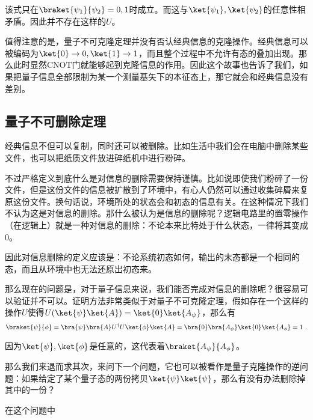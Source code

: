 该式只在$\braket{\psi_1}{\psi_2}=0,1$时成立。而这与$\ket{\psi_1},\ket{\psi_2}$的任意性相矛盾。因此并不存在这样的$U$。

值得注意的是，量子不可克隆定理并没有否认经典信息的克隆操作。经典信息可以被编码为$\ket{0}\to0,\ket{1}\to1$，而且整个过程中不允许有态的叠加出现。那么此时显然CNOT门就能够起到克隆信息的作用。因此这个故事也告诉了我们，如果把量子信息全部限制为某一个测量基矢下的本征态上，那它就会和经典信息没有差别。

\subsection{量子不可删除定理}

经典信息不但可以复制，同时还可以被删除。比如生活中我们会在电脑中删除某些文件，也可以把纸质文件放进碎纸机中进行粉碎。

不过严格定义到底什么是对信息的删除需要保持谨慎。比如说即使我们粉碎了一份文件，但是这份文件的信息被扩散到了环境中，有心人仍然可以通过收集碎屑来复原这份文件。换句话说，环境所处的状态会和初态的信息有关。在这种情况下我们不认为这是对信息的删除。那什么被认为是信息的删除呢？逻辑电路里的置零操作（在逻辑上）就是一种对信息的删除：不论本来比特处于什么状态，一律将其变成0。

因此对信息删除的定义应该是：不论系统初态如何，输出的末态都是一个相同的态，而且从环境中也无法还原出初态来。

那么现在的问题是，对于量子信息来说，我们能否完成对信息的删除呢？很容易可以验证并不可以。证明方法非常类似于对量子不可克隆定理，假如存在一个这样的操作$U$使得$U(\ket{\psi}\ket{A})=\ket{0}\ket{A_\psi}$，那么有
\begin{equation}
\braket{\psi}{\phi}=\bra{\psi}\bra{A}U^\dagger U\ket{\phi}\ket{A}=\bra{0}\bra{A_\psi}\ket{0}\ket{A_\phi}=1~.
\end{equation}

因为$\ket{\psi},\ket{\phi}$是任意的，这代表着$\braket{A_\psi}{A_\phi}$。

那么我们来退而求其次，来问下一个问题，它也可以被看作是量子克隆操作的逆问题：如果给定了某个量子态的两份拷贝$\ket{\psi}\ket{\psi}$，那么有没有办法删除掉其中的一份？

在这个问题中